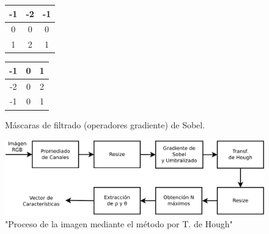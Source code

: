 \documentclass[conference,spanish,a4paper,10pt,oneside,final]{tfmpd}
\begin{document}
\begin{figure}
\begin{center}
\begin{tabular}{|c|c|c|}
\hline -1 & -2 & -1 \\\hline 0 & 0 & 0 \\\hline 1 & 2 & 1 \\\hline
\end{tabular}
\begin{tabular}{|c|c|c|}
\hline -1 & 0 & 1 \\\hline -2 & 0 & 2 \\\hline -1 & 0 & 1 \\\hline
\end{tabular}
\end{center}
\caption{Máscaras de filtrado (operadores gradiente) de Sobel.}
\label{masksobel}
\end{figure}


%

%
%
\begin{figure}
\begin{center}
\includegraphics[scale=0.25]{../diagramas/procesohough} 
\end{center}
\caption{"Proceso de la imagen mediante el método por T. de Hough"}
\label{procesohough}
\end{figure}
%
%
\end{document}
